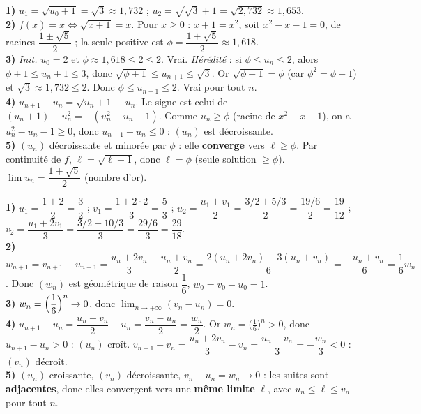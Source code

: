 \textbf{1)} $u_1=\sqrt{u_0+1}=\sqrt3\approx1{,}732$ ; $u_2=\sqrt{\sqrt3+1}=\sqrt{2{,}732}\approx1{,}653$.\\
\textbf{2)} $f(x)=x\iff\sqrt{x+1}=x$. Pour $x\ge0$ : $x+1=x^2$, soit $x^2-x-1=0$,
de racines $\dfrac{1\pm\sqrt5}{2}$ ; la seule positive est $\phi=\dfrac{1+\sqrt5}{2}\approx1{,}618$.\\
\textbf{3)} \emph{Init.} $u_0=2$ et $\phi\approx1{,}618\le2\le2$. Vrai.
\emph{Hérédité} : si $\phi\le u_n\le2$, alors $\phi+1\le u_n+1\le3$, donc
$\sqrt{\phi+1}\le u_{n+1}\le\sqrt3$. Or $\sqrt{\phi+1}=\phi$ (car $\phi^2=\phi+1$) et
$\sqrt3\approx1{,}732\le2$. Donc $\phi\le u_{n+1}\le2$. Vrai pour tout $n$.\\
\textbf{4)} $u_{n+1}-u_n=\sqrt{u_n+1}-u_n$. Le signe est celui de $(u_n+1)-u_n^2=-(u_n^2-u_n-1)$.
Comme $u_n\ge\phi$ (racine de $x^2-x-1$), on a $u_n^2-u_n-1\ge0$, donc $u_{n+1}-u_n\le0$ :
$(u_n)$ est décroissante.\\
\textbf{5)} $(u_n)$ décroissante et minorée par $\phi$ : elle \textbf{converge} vers $\ell\ge\phi$.
Par continuité de $f$, $\ell=\sqrt{\ell+1}$, donc $\ell=\phi$ (seule solution $\ge\phi$).
$\displaystyle\lim u_n=\dfrac{1+\sqrt5}{2}$ (nombre d'or).

\textbf{1)} $u_1=\dfrac{1+2}{2}=\dfrac32$ ; $v_1=\dfrac{1+2\cdot2}{3}=\dfrac53$ ;
$u_2=\dfrac{u_1+v_1}{2}=\dfrac{3/2+5/3}{2}=\dfrac{19/6}{2}=\dfrac{19}{12}$ ;
$v_2=\dfrac{u_1+2v_1}{3}=\dfrac{3/2+10/3}{3}=\dfrac{29/6}{3}=\dfrac{29}{18}$.\\
\textbf{2)} $w_{n+1}=v_{n+1}-u_{n+1}=\dfrac{u_n+2v_n}{3}-\dfrac{u_n+v_n}{2}
=\dfrac{2(u_n+2v_n)-3(u_n+v_n)}{6}=\dfrac{-u_n+v_n}{6}=\dfrac16 w_n$.
Donc $(w_n)$ est géométrique de raison $\dfrac16$, $w_0=v_0-u_0=1$.\\
\textbf{3)} $w_n=\Bigl(\dfrac16\Bigr)^n\to0$, donc $\displaystyle\lim_{n\to+\infty}(v_n-u_n)=0$.\\
\textbf{4)} $u_{n+1}-u_n=\dfrac{u_n+v_n}{2}-u_n=\dfrac{v_n-u_n}{2}=\dfrac{w_n}{2}$. Or
$w_n=\bigl(\tfrac16\bigr)^n>0$, donc $u_{n+1}-u_n>0$ : $(u_n)$ croît.
$v_{n+1}-v_n=\dfrac{u_n+2v_n}{3}-v_n=\dfrac{u_n-v_n}{3}=-\dfrac{w_n}{3}<0$ : $(v_n)$ décroît.\\
\textbf{5)} $(u_n)$ croissante, $(v_n)$ décroissante, $v_n-u_n=w_n\to0$ : les suites sont
\textbf{adjacentes}, donc elles convergent vers une \textbf{même limite} $\ell$, avec
$u_n\le\ell\le v_n$ pour tout $n$.
